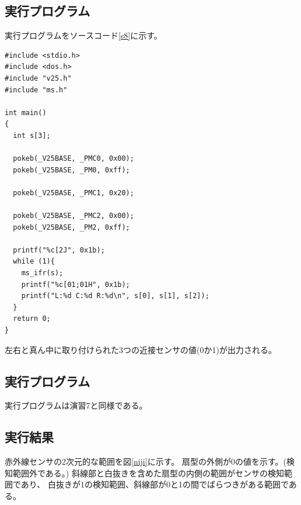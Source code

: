 \subsection{実行プログラム}
実行プログラムをソースコード\ref{s8}に示す。

\begin{lstlisting}[caption=演習7のプログラム,label=s8]
#include <stdio.h>
#include <dos.h>
#include "v25.h"
#include "ms.h"
  
int main()
{
  int s[3];
 
  pokeb(_V25BASE, _PMC0, 0x00); 
  pokeb(_V25BASE, _PM0, 0xff);  
 
  pokeb(_V25BASE, _PMC1, 0x20); 
      
  pokeb(_V25BASE, _PMC2, 0x00); 
  pokeb(_V25BASE, _PM2, 0xff); 
  
  printf("%c[2J", 0x1b); 
  while (1){
    ms_ifr(s); 
    printf("%c[01;01H", 0x1b); 
    printf("L:%d C:%d R:%d\n", s[0], s[1], s[2]); 
  }
  return 0;
}
\end{lstlisting}

左右と真ん中に取り付けられた3つの近接センサの値(0か1)が出力される。

\subsection{実行プログラム}
実行プログラムは演習7と同様である。

\subsection{実行結果}
赤外線センサの2次元的な範囲を図\ref{niji}に示す。
扇型の外側が0の値を示す。(検知範囲外である。)
斜線部と白抜きを含めた扇型の内側の範囲がセンサの検知範囲であり、
白抜きが1の検知範囲、斜線部が0と1の間でばらつきがある範囲である。


